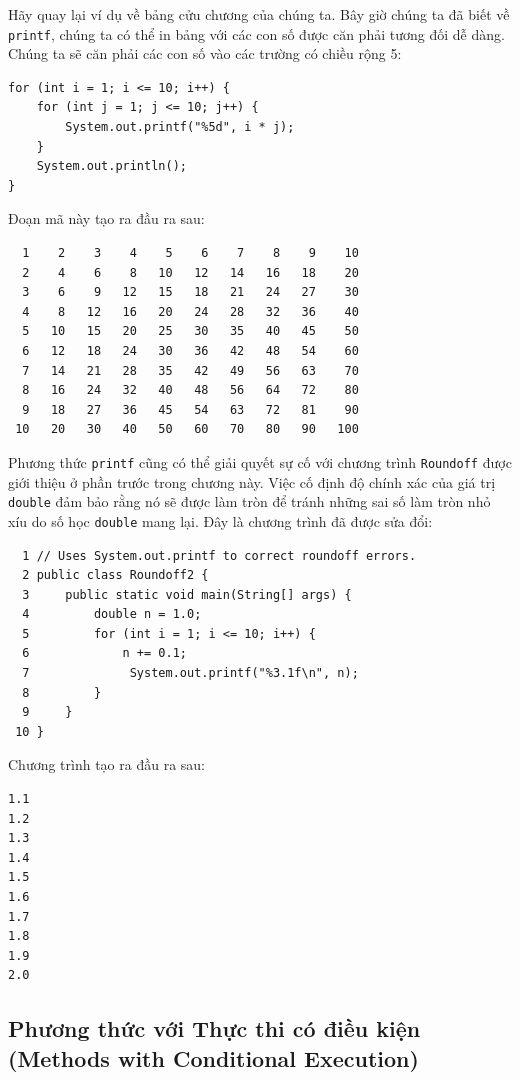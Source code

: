 Hãy quay lại ví dụ về bảng cửu chương của chúng ta. Bây giờ chúng ta đã
biết về \texttt{printf}, chúng ta có thể in bảng với các con số được căn
phải tương đối dễ dàng. Chúng ta sẽ căn phải các con số vào các trường
có chiều rộng 5:

\begin{verbatim}
for (int i = 1; i <= 10; i++) {
    for (int j = 1; j <= 10; j++) {
        System.out.printf("%5d", i * j); 
    }
    System.out.println();
}
\end{verbatim}

Đoạn mã này tạo ra đầu ra sau:

\begin{verbatim}
  1    2    3    4    5    6    7    8    9    10 
  2    4    6    8   10   12   14   16   18    20 
  3    6    9   12   15   18   21   24   27    30 
  4    8   12   16   20   24   28   32   36    40 
  5   10   15   20   25   30   35   40   45    50 
  6   12   18   24   30   36   42   48   54    60 
  7   14   21   28   35   42   49   56   63    70 
  8   16   24   32   40   48   56   64   72    80 
  9   18   27   36   45   54   63   72   81    90 
 10   20   30   40   50   60   70   80   90   100
\end{verbatim}

Phương thức \texttt{printf} cũng có thể giải quyết sự cố với chương
trình \texttt{Roundoff} được giới thiệu ở phần trước trong chương này.
Việc cố định độ chính xác của giá trị \texttt{double} đảm bảo rằng nó sẽ
được làm tròn để tránh những sai số làm tròn nhỏ xíu do số học
\texttt{double} mang lại. Đây là chương trình đã được sửa đổi:

\begin{verbatim}
  1 // Uses System.out.printf to correct roundoff errors.
  2 public class Roundoff2 {
  3     public static void main(String[] args) {
  4         double n = 1.0;
  5         for (int i = 1; i <= 10; i++) {
  6             n += 0.1;
  7              System.out.printf("%3.1f\n", n);
  8         }
  9     }
 10 }
\end{verbatim}

Chương trình tạo ra đầu ra sau:

\begin{verbatim}
1.1 
1.2 
1.3 
1.4 
1.5 
1.6 
1.7 
1.8 
1.9 
2.0
\end{verbatim}

\subsection{Phương thức với Thực thi có điều kiện (Methods with
Conditional
Execution)}\label{phux1b0ux1a1ng-thux1ee9c-vux1edbi-thux1ef1c-thi-cuxf3-ux111iux1ec1u-kiux1ec7n-methods-with-conditional-execution}

